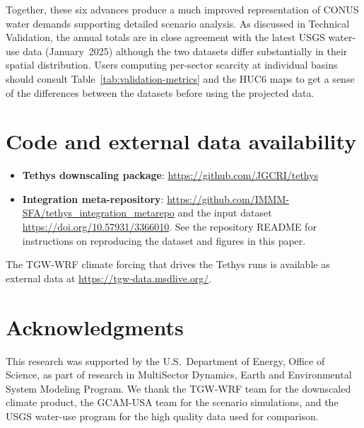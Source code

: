 \documentclass[fleqn,10pt]{wlscirep}
\begin{document}
Together, these six advances produce a much improved representation of CONUS water demands supporting detailed scenario analysis. As discussed in Technical Validation, the annual totals are in close agreement with the latest USGS water-use data (January~2025) although the two datasets differ substantially in their spatial distribution. Users computing per-sector scarcity at individual basins should consult Table~\ref{tab:validation-metrics} and the HUC6 maps to get a sense of the differences between the datasets before using the projected data.

\section*{Code and external data availability}

\begin{itemize}
    \item \textbf{Tethys downscaling package}: \url{https://github.com/JGCRI/tethys}
    \item \textbf{Integration meta-repository}: \url{https://github.com/IMMM-SFA/tethys_integration_metarepo} and the input dataset \url{https://doi.org/10.57931/3366010}. See the repository README for instructions on reproducing the dataset and figures in this paper.
\end{itemize}
The TGW-WRF climate forcing\cite{Jones2023TGW} that drives the Tethys runs is available as external data at \url{https://tgw-data.msdlive.org/}. 

\section*{Acknowledgments}

This research was supported by the U.S.~Department of Energy, Office of Science, as part of research in MultiSector Dynamics, Earth and Environmental System Modeling Program. We thank the TGW-WRF team for the downscaled climate product, the GCAM-USA team for the scenario simulations, and the USGS water-use program for the high quality data used for comparison.
\end{document}
